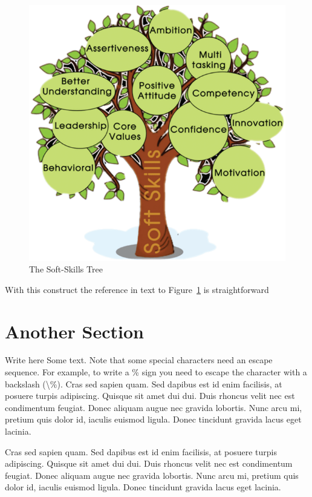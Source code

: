 \documentclass[a4paper,12pt,journal,twoside,compsoc]{PPIEEEtran}
\begin{document}
\begin{figure}[htb]
\centering
\includegraphics[width=1\linewidth]{soft_skills.png}
\caption{The Soft-Skills Tree}
\label{fig_sim}
\end{figure}

With this construct the reference in text to Figure~\ref{fig_sim} is straightforward
\section{Another Section}
Write here Some text. Note that some special characters need an escape sequence. For example, to write a \% sign you need to escape the character with a backslash (\textbackslash\%).
Cras sed sapien quam. Sed dapibus est id enim facilisis, at posuere turpis adipiscing. Quisque sit amet dui dui.
Duis rhoncus velit nec est condimentum feugiat. Donec aliquam augue nec gravida lobortis. Nunc arcu mi, pretium quis dolor id, iaculis euismod ligula. Donec tincidunt gravida lacus eget lacinia. 

Cras sed sapien quam. Sed dapibus est id enim facilisis, at posuere turpis adipiscing. Quisque sit amet dui dui.
Duis rhoncus velit nec est condimentum feugiat. Donec aliquam augue nec gravida lobortis. Nunc arcu mi, pretium quis dolor id, iaculis euismod ligula. Donec tincidunt gravida lacus eget lacinia. 
\end{document}

